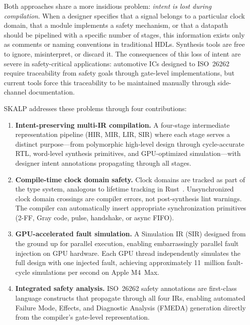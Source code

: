 \documentclass[conference]{IEEEtran}
\begin{document}
Both approaches share a more insidious problem: \emph{intent is lost during compilation}. When a designer specifies that a signal belongs to a particular clock domain, that a module implements a safety mechanism, or that a datapath should be pipelined with a specific number of stages, this information exists only as comments or naming conventions in traditional HDLs. Synthesis tools are free to ignore, misinterpret, or discard it. The consequences of this loss of intent are severe in safety-critical applications: automotive ICs designed to ISO~26262~\cite{iso26262} require traceability from safety goals through gate-level implementations, but current tools force this traceability to be maintained manually through side-channel documentation.

SKALP addresses these problems through four contributions:

\begin{enumerate}
  \item \textbf{Intent-preserving multi-IR compilation.} A four-stage intermediate representation pipeline (HIR, MIR, LIR, SIR) where each stage serves a distinct purpose---from polymorphic high-level design through cycle-accurate RTL, word-level synthesis primitives, and GPU-optimized simulation---with designer intent annotations propagating through all stages.

  \item \textbf{Compile-time clock domain safety.} Clock domains are tracked as part of the type system, analogous to lifetime tracking in Rust~\cite{rustbook}. Unsynchronized clock domain crossings are compiler errors, not post-synthesis lint warnings. The compiler can automatically insert appropriate synchronization primitives (2-FF, Gray code, pulse, handshake, or async FIFO).

  \item \textbf{GPU-accelerated fault simulation.} A Simulation IR (SIR) designed from the ground up for parallel execution, enabling embarrassingly parallel fault injection on GPU hardware. Each GPU thread independently simulates the full design with one injected fault, achieving approximately 11~million fault-cycle simulations per second on Apple M4~Max.

  \item \textbf{Integrated safety analysis.} ISO~26262 safety annotations are first-class language constructs that propagate through all four IRs, enabling automated Failure Mode, Effects, and Diagnostic Analysis (FMEDA) generation directly from the compiler's gate-level representation.
\end{enumerate}
\end{document}
